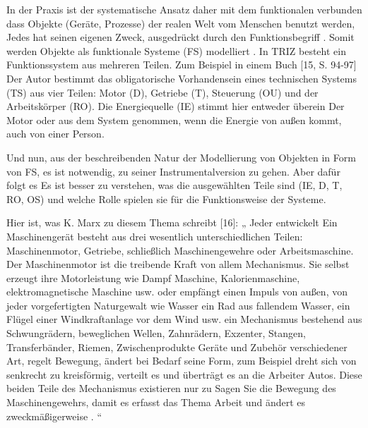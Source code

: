 \documentclass[11pt,a4paper]{article}
\begin{document}
In der Praxis ist der systematische Ansatz daher mit dem funktionalen
verbunden dass Objekte (Geräte, Prozesse) der realen Welt vom Menschen benutzt
werden, Jedes hat seinen eigenen Zweck, ausgedrückt durch den Funktionsbegriff
.  Somit werden Objekte als funktionale Systeme (FS) modelliert .  In TRIZ
besteht ein Funktionssystem aus mehreren Teilen. Zum Beispiel in einem Buch
[15, S. 94-97] Der Autor bestimmt das obligatorische Vorhandensein eines
technischen Systems (TS) aus vier Teilen: Motor (D), Getriebe (T), Steuerung
(OU) und der Arbeitskörper (RO). Die Energiequelle (IE) stimmt hier entweder
überein Der Motor oder aus dem System genommen, wenn die Energie von außen
kommt, auch von einer Person.

Und nun, aus der beschreibenden Natur der Modellierung von Objekten in Form
von FS, es ist notwendig, zu seiner Instrumentalversion zu gehen. Aber dafür
folgt es Es ist besser zu verstehen, was die ausgewählten Teile sind (IE, D,
T, RO, OS) und welche Rolle spielen sie für die Funktionsweise der Systeme.

Hier ist, was K. Marx zu diesem Thema schreibt [16]: „ Jeder entwickelt Ein
Maschinengerät besteht aus drei wesentlich unterschiedlichen Teilen:
Maschinenmotor, Getriebe, schließlich Maschinengewehre oder
Arbeitsmaschine. Der Maschinenmotor ist die treibende Kraft von allem
Mechanismus. Sie selbst erzeugt ihre Motorleistung wie Dampf Maschine,
Kalorienmaschine, elektromagnetische Maschine usw. oder empfängt einen Impuls
von außen, von jeder vorgefertigten Naturgewalt wie Wasser ein Rad aus
fallendem Wasser, ein Flügel einer Windkraftanlage vor dem Wind usw.  ein
Mechanismus bestehend aus Schwungrädern, beweglichen Wellen, Zahnrädern,
Exzenter, Stangen, Transferbänder, Riemen, Zwischenprodukte Geräte und Zubehör
verschiedener Art, regelt Bewegung, ändert bei Bedarf seine Form, zum Beispiel
dreht sich von senkrecht zu kreisförmig, verteilt es und überträgt es an die
Arbeiter Autos. Diese beiden Teile des Mechanismus existieren nur zu Sagen Sie
die Bewegung des Maschinengewehrs, damit es erfasst das Thema Arbeit und
ändert es zweckmäßigerweise . “
\end{document}
